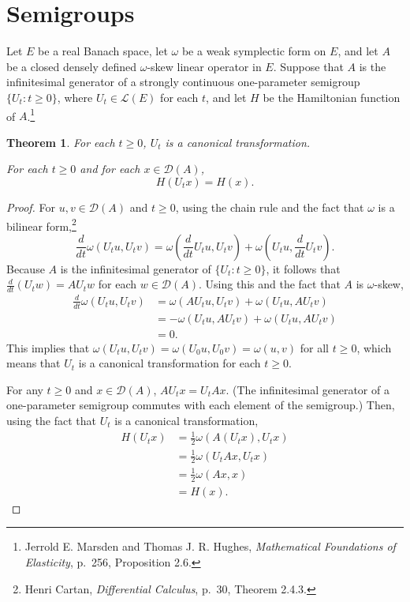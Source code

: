 \documentclass{article}
\newtheorem{theorem}{Theorem}
\theoremstyle{definition}
\begin{document}
\section{Semigroups}
Let $E$ be a real Banach space, let $\omega$ be a weak symplectic form on $E$, and let
$A$ be a closed densely defined $\omega$-skew linear operator in $E$.
Suppose that $A$ is the infinitesimal generator of a strongly continuous one-parameter semigroup $\{U_t: t \geq 0\}$, where
$U_t \in \mathscr{L}(E)$ for each $t$, and let
$H$ be the Hamiltonian function of $A$.\footnote{Jerrold E. Marsden and Thomas J. R. Hughes, {\em Mathematical Foundations of Elasticity}, p.~256, Proposition 2.6.}

\begin{theorem}
For each $t \geq 0$, $U_t$ is a canonical transformation.

For each $t \geq 0$ and for each $x \in \mathscr{D}(A)$,
\[
H(U_t x) = H(x).
\]
\label{flow}
\end{theorem}
\begin{proof}
For $u,v \in \mathscr{D}(A)$ and $t \geq 0$, using the chain rule and the fact that $\omega$ is a bilinear form,\footnote{Henri Cartan,
{\em Differential Calculus}, p.~30, Theorem 2.4.3.}
\[
\frac{d}{dt} \omega(U_t u,U_tv)=\omega\left(\frac{d}{dt} U_t u, U_tv \right)
+\omega\left(U_t u,\frac{d}{dt}U_tv\right).
\]
Because $A$ is the infinitesimal generator of $\{U_t: t \geq 0\}$, it follows
that $\frac{d}{dt}(U_t w) = AU_t w$ for each $w \in \mathscr{D}(A)$. Using this and the fact
that $A$ is $\omega$-skew,
\begin{align*}
\frac{d}{dt} \omega(U_t u,U_tv)&=\omega(AU_tu,U_tv)+\omega(U_tu,AU_tv)\\
&=-\omega(U_tu,AU_tv)+\omega(U_tu,AU_tv)\\
&=0.
\end{align*}
This implies that $\omega(U_t u,U_tv) = \omega(U_0 u, U_0 v)=\omega(u,v)$ for all $t \geq 0$, which means
that $U_t$ is a canonical transformation for each $t \geq 0$. 

For any $t \geq 0$ and $x \in \mathscr{D}(A)$, $AU_t x= U_t A x$. 
(The infinitesimal generator of a one-parameter semigroup commutes with each element of the semigroup.)
Then, using the fact that $U_t$ is a canonical transformation,
\begin{align*}
H(U_t x)&=\frac{1}{2}\omega(A(U_t x),U_t x)\\
&=\frac{1}{2}\omega(U_t Ax,U_tx)\\
&=\frac{1}{2}\omega(Ax,x)\\
&=H(x).
\end{align*}
\end{proof}
\end{document}
